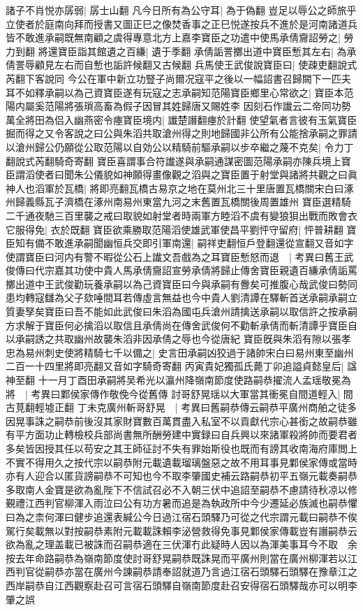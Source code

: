 諸子不肖悦亦孱弱|{
	孱士山翻}
凡今日所有為公守耳|{
	為于偽翻}
豈足以辱公之師旅乎立使者於庭南向拜而授書又圖正巳之像焚香事之正巳悦遂按兵不進於是河南諸道兵皆不敢進承嗣既無南顧之虞得專意北方上嘉李寶臣之功遣中使馬承倩齎詔勞之|{
	勞力到翻}
將還寶臣詣其館遺之百縑|{
	遺于季翻}
承倩詬詈擲出道中寶臣慙其左右|{
	為承倩詈辱顧見左右而自慙也詬許候翻又古候翻}
兵馬使王武俊說寶臣曰|{
	使疎吏翻說式芮翻下客說同}
今公在軍中新立功豎子尚爾况寇平之後以一幅詔書召歸闕下一匹夫耳不如釋承嗣以為己資寶臣遂有玩寇之志承嗣知范陽寶臣鄉里心常欲之|{
	寶臣本范陽内屬奚范陽將張瑣高畜為假子因冒其姓歸唐又賜姓李}
因刻石作䜟云二帝同功勢萬全將田為侣入幽燕密令瘞寶臣境内|{
	䜟楚譖翻瘞於計翻}
使望氣者言彼有玉氣寶臣掘而得之又令客說之曰公與朱滔共取滄州得之則地歸國非公所有公能捨承嗣之罪請以滄州歸公仍願從公取范陽以自効公以精騎前驅承嗣以步卒繼之蔑不克矣|{
	令力丁翻說式芮翻騎奇寄翻}
寶臣喜謂事合符䜟遂與承嗣通謀密圖范陽承嗣亦陳兵境上寶臣謂滔使者曰聞朱公儀貌如神願得畫像觀之滔與之寶臣置于射堂與諸將共觀之曰眞神人也滔軍於瓦橋|{
	將即亮翻瓦橋古易京之地在莫州北三十里唐置瓦橋關宋白曰涿州歸義縣瓦子濟橋在涿州南易州東當九河之末舊置瓦橋關後周置雄州}
寶臣選精騎二千通夜馳三百里襲之戒曰取貌如射堂者時兩軍方睦滔不虞有變狼狽出戰而敗會衣它服得免|{
	衣於既翻}
寶臣欲乘勝取范陽滔使雄武軍使昌平劉怦守留府|{
	怦普耕翻}
寶臣知有備不敢進承嗣聞幽恒兵交即引軍南還|{
	嗣祥吏翻恒戶登翻還從宣翻又音如字}
使謂寶臣曰河内有警不暇從公石上䜟文吾戲為之耳寶臣慙怒而退　|{
	考異曰舊王武俊傳曰代宗嘉其功使中貴人馬承倩齎詔宣勞承倩將歸止傳舍寶臣親遺百縑承倩詬罵擲出道中王武俊勸玩養承嗣以為己資寶臣曰今與承嗣有釁矣可推腹心哉武俊曰勢同患均轉寇讎為父子欬唾間耳若傳虛言無益也今中貴人劉清譚在驛斬首送承嗣承嗣立質妻孥矣寶臣曰吾不能如此武俊曰朱滔為國屯兵滄州請擒送承嗣以取信許之按承嗣方求解于寶臣何必擒滔以取信且承倩尚在傳舍武俊何不勸斬承倩而斬清譚乎寶臣自以承嗣誘之共取幽州故襲朱滔非因承倩之辱也今從唐紀}
寶臣旣與朱滔有隙以張孝忠為易州刺史使將精騎七千以備之|{
	史言田承嗣凶狡過于諸帥宋白曰易州東至幽州二百一十四里將即亮翻又音如字騎奇寄翻}
丙寅貴妃獨孤氏薨丁卯追謚貞懿皇后|{
	諡神至翻}
十一月丁酉田承嗣將吴希光以瀛州降嶺南節度使路嗣恭擢流人孟瑶敬冕為將　|{
	考異曰鄴侯家傳作敬俛今從舊傳}
討哥舒晃瑶以大軍當其衝冕自間道輕入|{
	間古莧翻輕墟正翻}
丁未克廣州斬哥舒晃　|{
	考異曰舊嗣恭傳云嗣恭平廣州商舶之徒多因晃事誅之嗣恭前後沒其家財寶數百萬貫盡入私室不以貢獻代宗心甚銜之故嗣恭雖有平方面功止轉檢校兵部尚書無所酬勞建中實録曰自兵興以來諸軍殺將帥而要君者多矣皆因授其任以苟安之其王師征討不失有罪始斯役也既而有謗其收南海府庫閲上不實不得用久之按代宗以嗣恭附元載遺載瑠璃盤惡之故不用耳事見鄴侯家傳或當時亦有人迎合以匿貨謗嗣恭不可知也今不取李肇國史補云路嗣恭初平五嶺元載奏嗣恭多取南人金寶是欲為亂陛下不信試召必不入朝三伏中追詔至嗣恭不慮請待秋凉以修覲禮江西判官柳渾入雨泣曰公有功方暑而追是為執政所中今少遷延必族滅也嗣恭懼曰為之柰何渾曰健步追還表緘公今日過江宿石頭驛乃可從之代宗謂元載曰嗣恭不俟駕行矣載無以對按嗣恭素附元載載誅賴李泌營救得免事見鄴侯家傳載豈有譖嗣恭云欲為亂之理盖載已被誅而召嗣恭適在三伏渾冇此疑時人因以為渾美事耳今不取　余按去年命路嗣恭為嶺南節度使討哥舒晃嗣恭既誅晃而平廣州則當在廣州柳渾若以江西判官從嗣恭亦當在廣州今諫嗣恭請奉詔就道乃言過江宿石頭驛石頭驛在豫章江之西岸嗣恭自江西觀察赴召可言宿石頭驛自嶺南節度赴召安得宿石頭驛哉亦可以明李肇之誤}
